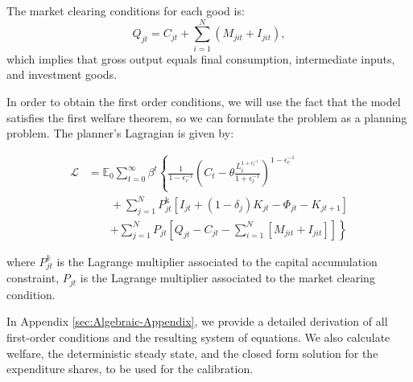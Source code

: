 The market clearing conditions for each good is:
\[
Q_{jt}=C_{jt}+\sum_{i=1}^{N}\left(M_{jit}+I_{jit}\right),
\]
which implies that gross output equals final consumption, intermediate inputs, and investment goods.

In order to obtain the first order conditions, we will use the fact
that the model satisfies the first welfare theorem, so we can formulate
the problem as a planning problem. The planner's Lagragian is given by:

\begin{align*}
\mathcal{{L}} & =\mathbb{{E}}_{0}\sum_{t=0}^{\infty}\beta^{t}\left\{ \frac{1}{1-\epsilon_{c}^{-1}}\left(C_{t}-\theta\frac{L_{t}^{1+\epsilon_{l}^{-1}}}{1+\epsilon_{l}^{-1}}\right)^{1-\epsilon_{c}^{-1}}\right.\\
 & \qquad+\sum_{j=1}^{N}P_{jt}^{\text{k}}\left[I_{jt}+(1-\delta_{j})K_{jt}-\Phi_{jt}-K_{jt+1}\right]\\
 & \qquad\left.+\sum_{j=1}^{N}P_{jt}\left[Q_{jt}-C_{jt}-\sum_{i=1}^{N}\left[M_{jit}+I_{jit}\right]\right]\right\} 
\end{align*}

where $P_{jt}^{k}$ is the Lagrange multiplier associated to the capital accumulation
constraint, $P_{jt}$ is the Lagrange multiplier associated to the market clearing
condition.

In Appendix \ref{sec:Algebraic-Appendix}, we provide a detailed derivation of all first-order conditions and the resulting system of equations. We also calculate welfare, the deterministic steady state, and the closed form solution for the expenditure shares, to be used for the calibration.
